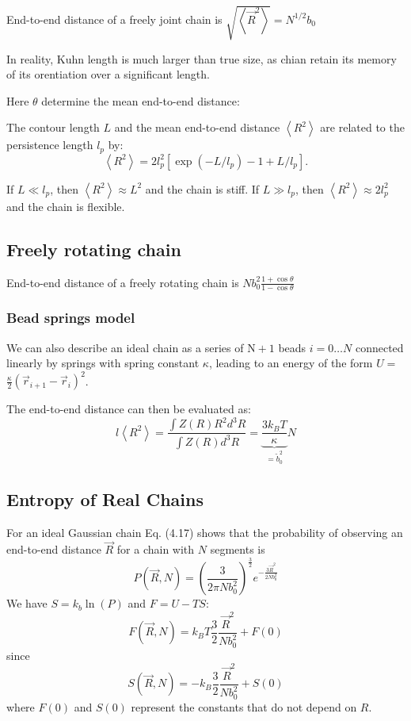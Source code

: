 \documentclass[12pt,a4paper]{article}
\begin{document}
End-to-end distance of a freely joint chain is $\sqrt{\left\langle\vec{R}^2\right\rangle}=N^{1 / 2} b_0$

In reality, Kuhn length is much larger than true size, as chian retain its memory of its orentiation over a significant length.

Here $\theta$ determine the mean end-to-end distance:

The contour length $L$ and the mean end-to-end distance $\left\langle R^2\right\rangle$ are related to the persistence length $l_p$ by:
$$
\left\langle R^2\right\rangle=2 l_p^2\left[\exp \left(-L / l_p\right)-1+L / l_p\right] .
$$

If $L \ll l_p$, then $\left\langle R^2\right\rangle \approx L^2$ and the chain is stiff. If $L \gg l_p$, then $\left\langle R^2\right\rangle \approx 2 l_p^2$ and the chain is flexible.


\subsection{Freely rotating chain}
End-to-end distance of a freely rotating chain is $N b_0^2 \frac{1+\cos \theta}{1-\cos \theta}$
\subsubsection{Bead springs model}
We can also describe an ideal chain as a series of $\mathrm{N}+1$ beads $i=0 \ldots N$ connected linearly by springs with spring constant $\kappa$, leading to an energy of the form $U=$ $\frac{\kappa}{2}\left(\vec{r}_{i+1}-\vec{r}_i\right)^2$. 

The end-to-end distance can then be evaluated as:
$$l\left\langle R^2\right\rangle=\frac{\int Z(R) R^2 d^3 R}{\int Z(R) d^3 R}=\underbrace{\frac{3 k_B T}{\kappa}}_{=\tilde{b}_0^2} N$$

\subsection{Entropy of Real Chains
}

For an ideal Gaussian chain Eq. (4.17) shows that the probability of observing an end-to-end distance $\vec{R}$ for a chain with $N$ segments is
$$
P(\vec{R}, N)=\left(\frac{3}{2 \pi N b_0^2}\right)^{\frac{3}{2}} e^{-\frac{3 \vec{R}^2}{2 N b_0^2}}
$$
We have $S = k_b \ln(P)$ and $F= U- TS$:
$$
F(\vec{R}, N)=k_B T \frac{3}{2} \frac{\vec{R}^2}{N b_0^2}+F(0)
$$
since
$$
S(\vec{R}, N)=-k_B \frac{3}{2} \frac{\vec{R}^2}{N b_0^2}+S(0)
$$
where $F(0)$ and $S(0)$ represent the constants that do not depend on $R$.
\end{document}
